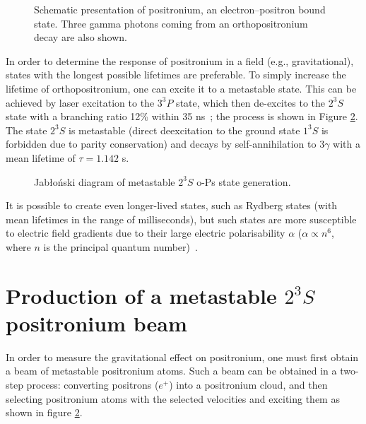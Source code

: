 \documentclass[12pt]{report}
\begin{document}
\begin{figure}[ht!]
    \centering
    \scalebox{1.6}{}
    \caption[Positronium structure and three-photon decay]{Schematic presentation of positronium, an electron--positron bound state. Three gamma photons coming from an orthopositronium decay are also shown.}
    \label{fig:pos}
\end{figure}

In order to determine the response of positronium in a field (e.g., gravitational), states with the longest possible lifetimes are preferable. To simply increase the lifetime of orthopositronium, one can excite it to a metastable state. This can be achieved by laser excitation to the $3^3P$ state, which then de-excites to the $2^3S$ state with a branching ratio 12\% within 35 ns~\cite{Aghion_Amsler_Antonello_Belov_Bonomi_Brusa_Caccia_Camper_Caravita_Castelli_etal._2018}; the process is shown in Figure \ref{fig:jab}. The state $2^3S$ is metastable (direct deexcitation to the ground state $1^3S$ is forbidden due to parity conservation) and decays by self-annihilation to $3\gamma$ with a mean lifetime of $\tau=1.142$ \textmu s.
\begin{figure}[ht!]
\centering
\scalebox{0.8}{}
\caption[Metastable positronium: Jabłoński diagram]{Jabłoński diagram of metastable $2^3S$ o-Ps state generation.}
\label{fig:jab}
\end{figure}

It is possible to create even longer-lived states, such as Rydberg states (with mean lifetimes in the range of milliseconds), but such states are more susceptible to electric field gradients  due to their large electric polarisability \(\alpha\) ($\alpha\propto n^6$, where \(n\) is the principal quantum number)~\cite{Cassidy_2018,Mariazzi_Caravita_Doser_Nebbia_Brusa_2020}.

\section[Production of a metastable 23S positronium beam]{Production of a metastable $2^3S$ positronium beam}

In order to measure the gravitational effect on positronium, one must first obtain a beam of metastable positronium atoms. Such a beam can be obtained in a two-step process: converting positrons ($e^+$) into a positronium cloud, and then selecting positronium atoms with the selected velocities and exciting them as shown in figure \ref{fig:jab}.
\end{document}
